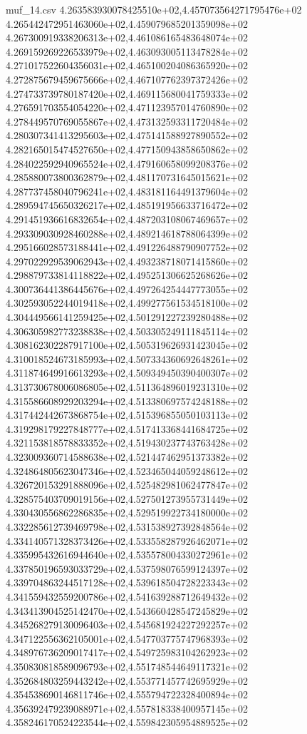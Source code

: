 \begin{filecontents*}{muf_14.csv}
4.263583930078425510e+02,4.457073564271795476e+02
4.265442472951463060e+02,4.459079685201359098e+02
4.267300919338206313e+02,4.461086165483648074e+02
4.269159269226533979e+02,4.463093005113478284e+02
4.271017522604356031e+02,4.465100204086365920e+02
4.272875679459675666e+02,4.467107762397372426e+02
4.274733739780187420e+02,4.469115680041759333e+02
4.276591703554054220e+02,4.471123957014760890e+02
4.278449570769055867e+02,4.473132593311720484e+02
4.280307341413295603e+02,4.475141588927890552e+02
4.282165015474527650e+02,4.477150943858650862e+02
4.284022592940965524e+02,4.479160658099208376e+02
4.285880073800362879e+02,4.481170731645015621e+02
4.287737458040796241e+02,4.483181164491379604e+02
4.289594745650326217e+02,4.485191956633716472e+02
4.291451936616832654e+02,4.487203108067469657e+02
4.293309030928460288e+02,4.489214618788064399e+02
4.295166028573188441e+02,4.491226488790907752e+02
4.297022929539062943e+02,4.493238718071415860e+02
4.298879733814118822e+02,4.495251306625268626e+02
4.300736441386445676e+02,4.497264254447773055e+02
4.302593052244019418e+02,4.499277561534518100e+02
4.304449566141259425e+02,4.501291227239280488e+02
4.306305982773238838e+02,4.503305249111845114e+02
4.308162302287917100e+02,4.505319626931423045e+02
4.310018524673185993e+02,4.507334360692648261e+02
4.311874649916613293e+02,4.509349450390400307e+02
4.313730678006086805e+02,4.511364896019231310e+02
4.315586608929203294e+02,4.513380697574248188e+02
4.317442442673868754e+02,4.515396855050103113e+02
4.319298179227848777e+02,4.517413368441684725e+02
4.321153818578833352e+02,4.519430237743763428e+02
4.323009360714588638e+02,4.521447462951373382e+02
4.324864805623047346e+02,4.523465044059248612e+02
4.326720153291888096e+02,4.525482981062477847e+02
4.328575403709019156e+02,4.527501273955731449e+02
4.330430556862286835e+02,4.529519922734180000e+02
4.332285612739469798e+02,4.531538927392848564e+02
4.334140571328373426e+02,4.533558287926462071e+02
4.335995432616944640e+02,4.535578004330272961e+02
4.337850196593033729e+02,4.537598076599124397e+02
4.339704863244517128e+02,4.539618504728223343e+02
4.341559432559200786e+02,4.541639288712649432e+02
4.343413904525142470e+02,4.543660428547245829e+02
4.345268279130096403e+02,4.545681924227292257e+02
4.347122556362105001e+02,4.547703775747968393e+02
4.348976736209017417e+02,4.549725983104262923e+02
4.350830818589096793e+02,4.551748544649117321e+02
4.352684803259443242e+02,4.553771457742695929e+02
4.354538690146811746e+02,4.555794722328400894e+02
4.356392479239088971e+02,4.557818338400957145e+02
4.358246170524223544e+02,4.559842305954889525e+02

\end{filecontents*}
